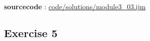 \textbf{sourcecode} : \href{http://www.example.com/contents}{code/solutions/module3\_03.ijm}

\subsection{Exercise 5}